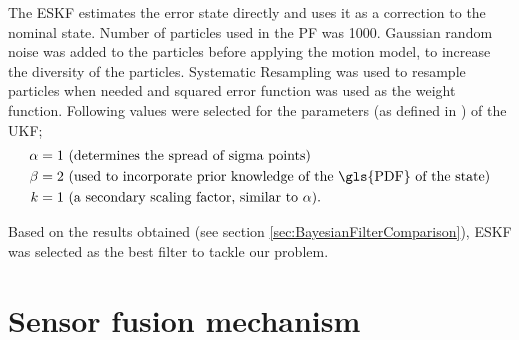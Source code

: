 The \gls{ESKF} estimates the error state directly and uses it as a correction to the nominal state. Number of particles used in the \gls{PF} was 1000. Gaussian random noise was added to the particles before applying the motion model, to increase the diversity of the particles. Systematic Resampling was used to resample particles when needed and squared error function was used as the weight function. Following values were selected for the parameters (as defined in \cite{ch26:wan2000unscented}) of the \gls{UKF};
\begin{align}
	\alpha &= 1 \text{ (determines the spread of sigma points)}\\
	\beta & = 2 \text{ (used to incorporate prior knowledge of the \gls{PDF} of the state)}\\
	k &= 1 \text{ (a secondary scaling factor, similar to $\alpha$)}.
\end{align}

Based on the results obtained (see section \ref{sec:BayesianFilterComparison}), \gls{ESKF} was selected as the best filter to tackle our problem.









\section{Sensor fusion mechanism}

